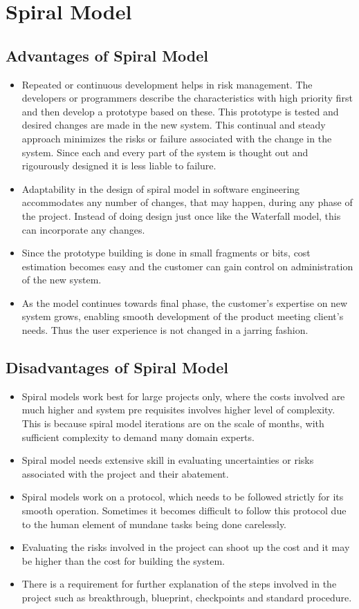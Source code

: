 \documentclass{article}
\begin{document}
\newpage{}
\section{Spiral Model}
\subsection{Advantages of Spiral Model}
\begin{itemize}
\item Repeated or continuous development helps in risk management. The developers or programmers describe the characteristics with high priority first and then develop a prototype based on these. This prototype is tested and desired changes are made in the new system. This continual and steady approach minimizes the risks or failure associated with the change in the system. Since each and every part of
the system is thought out and rigourously designed it is less liable to failure.
\item Adaptability in the design of spiral model in software engineering accommodates any number of changes, that may happen, during any phase of the project. Instead of doing design just once like the Waterfall model, this can incorporate any changes.
\item Since the prototype building is done in small fragments or bits, cost estimation becomes easy and the customer can gain control on administration of the new system.
\item As the model continues towards final phase, the customer's expertise on new system grows, enabling smooth development of the product meeting client's needs. Thus the user experience is not changed in a jarring fashion.
\end{itemize}

\subsection{Disadvantages of Spiral Model}
\begin{itemize}
\item Spiral models work best for large projects only, where the costs involved are much higher and system pre requisites involves higher level of complexity. This is because spiral model iterations are on the scale of months, with sufficient complexity to demand many domain experts.
\item Spiral model needs extensive skill in evaluating uncertainties or risks associated with the project and their abatement.
\item Spiral models work on a protocol, which needs to be followed strictly for its smooth operation. Sometimes it becomes difficult to follow this protocol due to the human element of mundane tasks being done carelessly.
\item Evaluating the risks involved in the project can shoot up the cost and it may be higher than the cost for building the system.
\item There is a requirement for further explanation of the steps involved in the project such as breakthrough, blueprint, checkpoints and standard procedure.
\end{itemize}
\end{document}
